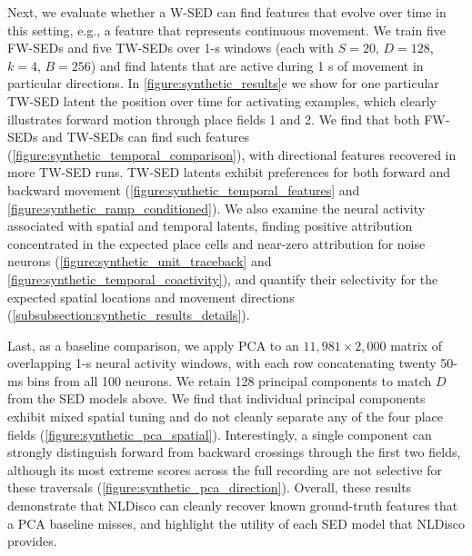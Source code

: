 Next, we evaluate whether a W-SED can find features that evolve over time in this setting, e.g., a feature that represents continuous movement. We train five FW-SEDs and five TW-SEDs over 1-s windows (each with $S=20$, $D=128$, $k=4$, $B=256$) and find latents that are active during 1 s of movement in particular directions. In \autoref{figure:synthetic_results}e we show for one particular TW-SED latent the position over time for activating examples, which clearly illustrates forward motion through place fields 1 and 2. We find that both FW-SEDs and TW-SEDs can find such features (\autoref{figure:synthetic_temporal_comparison}), with directional features recovered in more TW-SED runs. TW-SED latents exhibit preferences for both forward and backward movement (\autoref{figure:synthetic_temporal_features} and \autoref{figure:synthetic_ramp_conditioned}). We also examine the neural activity associated with spatial and temporal latents, finding positive attribution concentrated in the expected place cells and near-zero attribution for noise neurons (\autoref{figure:synthetic_unit_traceback} and \autoref{figure:synthetic_temporal_coactivity}), and quantify their selectivity for the expected spatial locations and movement directions (\hyperref[subsubsection:synthetic_results_details]{\ref*{subsubsection:synthetic_results_details}}). 

Last, as a baseline comparison, we apply PCA to an $11{,}981\times2{,}000$ matrix of overlapping 1-s neural activity windows, with each row concatenating twenty 50-ms bins from all 100 neurons. We retain 128 principal components to match $D$ from the SED models above. We find that individual principal components exhibit mixed spatial tuning and do not cleanly separate any of the four place fields (\autoref{figure:synthetic_pca_spatial}). Interestingly, a single component can strongly distinguish forward from backward crossings through the first two fields, although its most extreme scores across the full recording are not selective for these traversals (\autoref{figure:synthetic_pca_direction}). Overall, these results demonstrate that NLDisco can cleanly recover known ground-truth features that a PCA baseline misses, and highlight the utility of each SED model that NLDisco provides.

